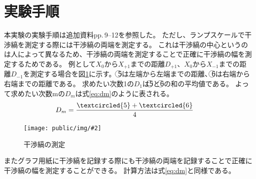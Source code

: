 \documentclass[paper=a4paper]{jlreq}
\newcommand{\Figure}[4]{
  \begin{figure}[H]
    \centering
    \texttt{[image: public/img/\#2]}
    \caption{#3}
    \label{fig:#4}
  \end{figure}
}
\begin{document}
\section{実験手順}
本実験の実験手順は追加資料\textnormal{\textup{pp.}\,\textnormal{9--12}}を参照した。
ただし、ランプスケールで干渉縞を測定する際には干渉縞の両端を測定する。
これは干渉縞の中心というのは人によって異なるため、干渉縞の両端を測定することで正確に干渉縞の幅を測定するためである。
例として$X_{0}$から$X_{+1}$までの距離$D_{+1}$、$X_{0}$から$X_{-1}$までの距離$D_{-1}$を測定する場合を図\ref{fig:measure}に示す。
\textcircled{\scriptsize 5}は左端から左端までの距離、\textcircled{\scriptsize 6}は右端から右端までの距離である。
求めたい次数1の$D_{1}$は\textcircled{\scriptsize 5}と\textcircled{\scriptsize 6}の和の平均値である。
よって求めたい次数mの$D_{m}$は式\eqref{eq:dm}のように表される。
\begin{equation}
  \label{eq:dm}
  \begin{aligned}
    D_{m} & = \frac{\textcircled{\scriptsize 5} + \textcircled{\scriptsize 6}}{4}
  \end{aligned}
\end{equation}
\Figure{0.8}{ruler.drawio.png}{干渉縞の測定}{measure}
またグラフ用紙に干渉縞を記録する際にも干渉縞の両端を記録することで正確に干渉縞の幅を測定することができる。
計算方法は式\eqref{eq:dm}と同様である。
\end{document}
